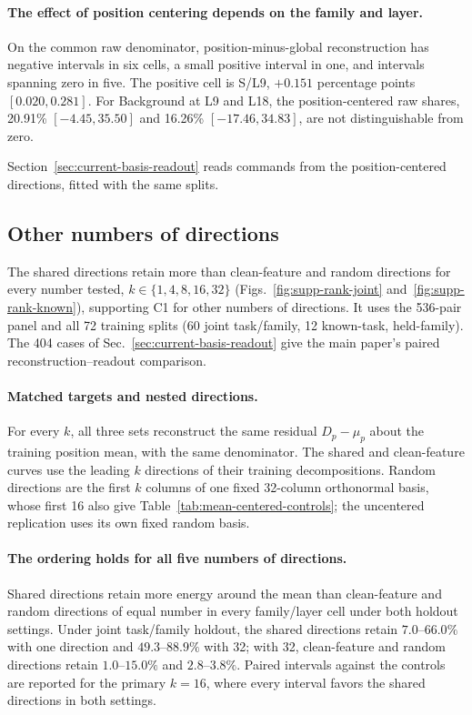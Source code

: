 \paragraph{The effect of position centering depends on the family and layer.}
On the common raw denominator, position-minus-global reconstruction has negative intervals in six cells, a small positive interval in one, and intervals spanning zero in five. The positive cell is S/L9, $+0.151$ percentage points $[0.020,0.281]$. For Background at L9 and L18, the position-centered raw shares, 20.91\% $[-4.45,35.50]$ and 16.26\% $[-17.46,34.83]$, are not distinguishable from zero.

Section~\ref{sec:current-basis-readout} reads commands from the position-centered directions, fitted with the same splits.

\subsection{Other numbers of directions}
\label{sec:rank-sensitivity}
The shared directions retain more than clean-feature and random directions for every number tested, $k\in\{1,4,8,16,32\}$ (Figs.~\ref{fig:supp-rank-joint} and~\ref{fig:supp-rank-known}), supporting C1 for other numbers of directions. It uses the 536-pair panel and all 72 training splits (60 joint task/family, 12 known-task, held-family). The 404 cases of Sec.~\ref{sec:current-basis-readout} give the main paper's paired reconstruction--readout comparison.

\paragraph{Matched targets and nested directions.}
For every $k$, all three sets reconstruct the same residual $D_p-\mu_p$ about the training position mean, with the same denominator. The shared and clean-feature curves use the leading $k$ directions of their training decompositions. Random directions are the first $k$ columns of one fixed 32-column orthonormal basis, whose first 16 also give Table~\ref{tab:mean-centered-controls}; the uncentered replication uses its own fixed random basis.

\paragraph{The ordering holds for all five numbers of directions.}
Shared directions retain more energy around the mean than clean-feature and random directions of equal number in every family/layer cell under both holdout settings. Under joint task/family holdout, the shared directions retain $7.0$--$66.0\%$ with one direction and $49.3$--$88.9\%$ with 32; with 32, clean-feature and random directions retain $1.0$--$15.0\%$ and $2.8$--$3.8\%$. Paired intervals against the controls are reported for the primary $k=16$, where every interval favors the shared directions in both settings.

